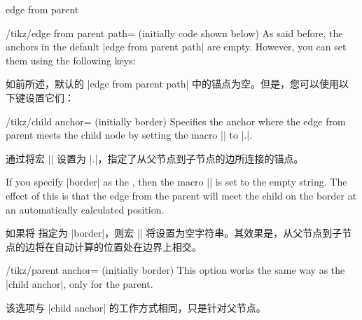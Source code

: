 \begin{pathoperation}{edge from parent}{}
\begin{enumerate}
\begin{key}{/tikz/edge from parent path= (initially \normalfont code shown below)}
                As said before, the anchors in the default
                |edge from parent path| are empty. However, you can set them
                using the following keys:
                
                如前所述，默认的 |edge from parent path| 中的锚点为空。但是，您可以使用以下键设置它们：

                \begin{key}{/tikz/child anchor= (initially border)}
                    Specifies the anchor where the edge from parent meets the
                    child node by setting the macro |\tikzchildanchor| to
                    |.|.

                    通过将宏 |\tikzchildanchor| 设置为 |.|，指定了从父节点到子节点的边所连接的锚点。

                    If you specify |border| as the , then the
                    macro |\tikzchildanchor| is set to the empty string. The
                    effect of this is that the edge from the parent will meet
                    the child on the border at an automatically calculated
                    position.
                    
                    如果将  指定为 |border|，则宏 |\tikzchildanchor| 将设置为空字符串。其效果是，从父节点到子节点的边将在自动计算的位置处在边界上相交。

                    \begin{codeexample}[]
\end{codeexample}
                \end{key}

                \begin{key}{/tikz/parent anchor= (initially border)}
                    This option works the same way as the |child anchor|, only
                    for the parent.

                    该选项与 |child anchor| 的工作方式相同，只是针对父节点。


                \end{key}
            \end{key}
    \end{enumerate}


\end{pathoperation}
